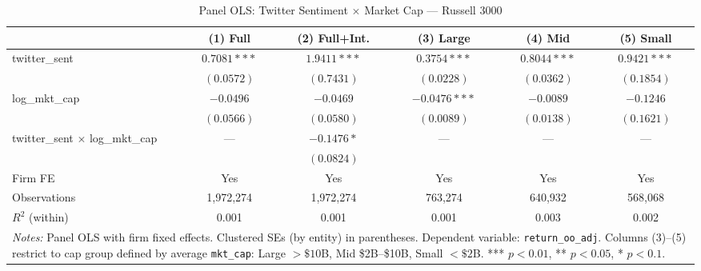 \begin{table}[htbp]
\centering
\caption{Panel OLS: Twitter Sentiment $\times$ Market Cap --- Russell 3000}
\label{tab:russel_cap_ols}
\begin{tabular}{lccccc}
\hline\hline
 & (1) Full & (2) Full+Int. & (3) Large & (4) Mid & (5) Small \\
\hline
\addlinespace[1ex]
twitter\_sent & $0.7081***$ & $1.9411***$ & $0.3754***$ & $0.8044***$ & $0.9421***$ \\
 & $(0.0572)$ & $(0.7431)$ & $(0.0228)$ & $(0.0362)$ & $(0.1854)$ \\
\addlinespace[0.5ex]
log\_mkt\_cap & $-0.0496$ & $-0.0469$ & $-0.0476***$ & $-0.0089$ & $-0.1246$ \\
 & $(0.0566)$ & $(0.0580)$ & $(0.0089)$ & $(0.0138)$ & $(0.1621)$ \\
\addlinespace[0.5ex]
twitter\_sent $\times$ log\_mkt\_cap & --- & $-0.1476*$ & --- & --- & --- \\
 &  & $(0.0824)$ &  &  &  \\
\addlinespace[0.5ex]
\midrule
\addlinespace[0.5ex]
Firm FE & Yes & Yes & Yes & Yes & Yes \\
\addlinespace[0.5ex]
Observations & 1,972,274 & 1,972,274 & 763,274 & 640,932 & 568,068 \\
\addlinespace[0.5ex]
$R^2$ (within) & 0.001 & 0.001 & 0.001 & 0.003 & 0.002 \\
\hline\hline
\multicolumn{6}{p{0.95\linewidth}}{\footnotesize \textit{Notes:} Panel OLS with firm fixed effects. Clustered SEs (by entity) in parentheses. Dependent variable: \texttt{return_oo_adj}. Columns (3)--(5) restrict to cap group defined by average \texttt{{mkt\_cap}}: Large $>\$10$B, Mid \$2B--\$10B, Small $<\$2$B. *** $p<0.01$, ** $p<0.05$, * $p<0.1$.}}
\end{tabular}
\end{table}